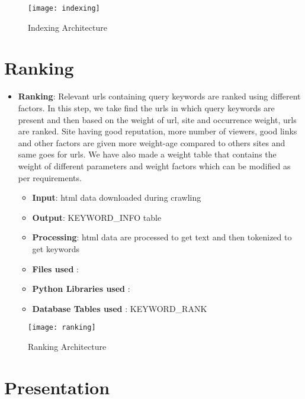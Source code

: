 \documentclass{scrreprt}
\begin{document}
\begin{figure}[h]
\begin{center}
\texttt{[image: indexing]}
\caption{Indexing Architecture}
\end{center}
\end{figure} 

\section{Ranking}
\begin{itemize}

\item\textbf {Ranking}: Relevant urls containing query keywords are ranked using different factors. In this step, we take find the urls in which query keywords are present and then based on the weight of url, site and occurrence weight, urls are ranked. Site having good reputation, more number of viewers, good links and other factors are given more weight-age compared to others sites and same goes for urls. We have also made a
weight table that contains the weight of different parameters and weight factors which can be modified as per requirements.

 \begin{itemize}
     \item \textbf{Input}: html data downloaded during crawling
    \item \textbf{Output}: KEYWORD_INFO table
    \item \textbf{Processing}: html data are processed to get text and then tokenized to get keywords
     \item \textbf{Files used} : 
        \item \textbf{Python Libraries used} :   

        
        \item \textbf{Database Tables used} : KEYWORD_RANK
        

     \end{itemize}
 
\end{itemize}


\begin{figure}[h]
\begin{center}
\texttt{[image: ranking]}
\caption{Ranking Architecture}
\end{center}
\end{figure} 

\section{Presentation}
\end{document}
